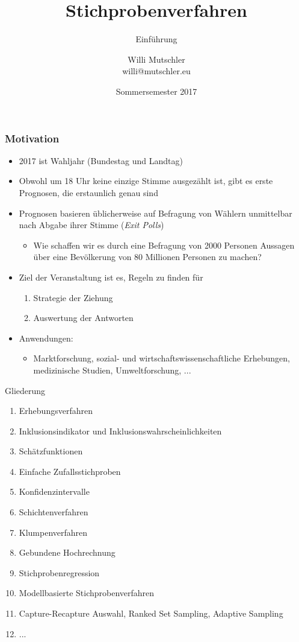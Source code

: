 \documentclass[9pt]{beamer}
\title{Stichprobenverfahren}
\subtitle{Einf\"{u}hrung}
\date[SS2017]{Sommersemester 2017}
\author{Willi Mutschler\\willi@mutschler.eu}
\begin{document}
\maketitle


\begin{frame}\frametitle{Motivation}
	\begin{itemize}
		\item 2017 ist Wahljahr (Bundestag und Landtag)
		\item Obwohl um 18 Uhr keine einzige Stimme ausgez\"{a}hlt ist, gibt es erste Prognosen, die erstaunlich genau sind
		\item Prognosen basieren \"{u}blicherweise auf Befragung von W\"{a}hlern unmittelbar nach Abgabe ihrer Stimme (\emph{Exit Polls})
	\begin{itemize}	
    \item Wie schaffen wir es durch eine Befragung von 2000 Personen Aussagen \"{u}ber eine Bev\"{o}lkerung von 80 Millionen Personen zu machen?
    \end{itemize}
		\item Ziel der Veranstaltung ist es, Regeln zu finden f\"{u}r
		\begin{enumerate}
			\item Strategie der Ziehung
			\item Auswertung der Antworten
		\end{enumerate}
		\item Anwendungen:
        \begin{itemize}
        \item Marktforschung, sozial- und wirtschaftswissenschaftliche Erhebungen, medizinische Studien, Umweltforschung, ...
        \end{itemize}
	\end{itemize}
\end{frame}

\begin{frame}{Gliederung}
	\begin{enumerate}
		\item Erhebungsverfahren
		\item Inklusionsindikator und Inklusionswahrscheinlichkeiten
        \item Sch\"{a}tzfunktionen
        \item Einfache Zufallsstichproben
        \item Konfidenzintervalle
        \item Schichtenverfahren
        \item Klumpenverfahren
        \item Gebundene Hochrechnung
        \item Stichprobenregression
        \item Modellbasierte Stichprobenverfahren
        \item Capture-Recapture Auswahl, Ranked Set Sampling, Adaptive Sampling
        \item ...
	\end{enumerate}
\end{frame}
\end{document}
